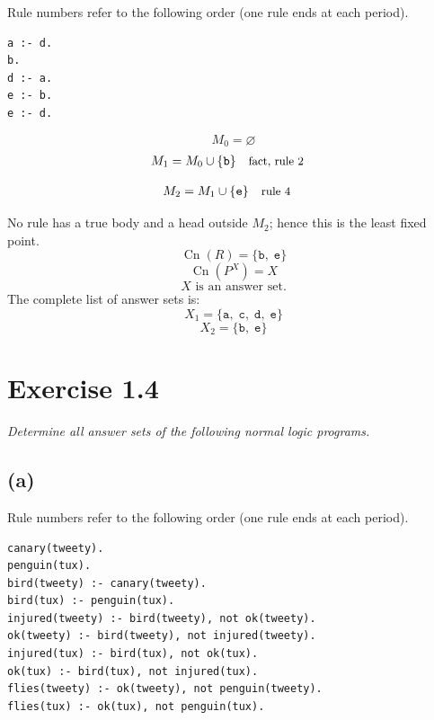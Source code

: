 \documentclass[a4paper,11pt]{article}
\newif\ifexplain
\newcommand{\explain}[1]{\ifexplain\begin{erklbox}#1\end{erklbox}\fi}
\newcommand{\why}[1]{\text{\small #1}}
\newcommand{\angabe}[1]{\textit{#1}\par}
\newcommand{\aufgabe}[1]{\section*{Exercise #1}}
\newcommand{\teil}[1]{\subsection*{(#1)}}
\newcommand{\at}[1]{\texttt{#1}}
\begin{document}
Rule numbers refer to the following order (one rule ends at each period).
\begin{small}
\begin{verbatim}
a :- d.
b.
d :- a.
e :- b.
e :- d.
\end{verbatim}
\end{small}
\explain{Beim Redukt bleibt die Kandidatenmenge fest. Wir entscheiden zuerst, welche Regeln wegfallen. Erst danach berechnen wir aus den verbleibenden positiven Regeln die kleinste abgeschlossene Menge. Ein Modell allein reicht nicht: Diese Menge muss genau der Kandidat sein.}
\[
M_0=\varnothing
\]
\begin{align*}
M_{1} &= M_{0}\cup \{\at{b}\} && \why{fact, rule 2}
\end{align*}
\explain{Diese Regel hat keinen Körper. Ihr Kopf $\at{b}$ ist damit ein Fakt und muss in die Menge.}
\begin{align*}
M_{2} &= M_{1}\cup \{\at{e}\} && \why{rule 4}
\end{align*}
\explain{Für $\at{e}$ brauchen wir $\at{b}$. Weil diese Voraussetzungen bereits hergeleitet sind, dürfen wir den Regelkopf jetzt aufnehmen und alle bisherigen Atome behalten; bei einer fehlenden Voraussetzung würde diese Regel dagegen noch nichts beitragen.}
No rule has a true body and a head outside $M_{2}$; hence this is the least fixed point.
\[
\operatorname{Cn}(R)=\{\at{b},\;\at{e}\}
\]
\[
\operatorname{Cn}(P^X)=X
\]
\[
\boxed{X\text{ is an answer set.}}
\]
The complete list of answer sets is:
\[
\boxed{X_1=\{\at{a},\;\at{c},\;\at{d},\;\at{e}\}}
\]
\[
\boxed{X_2=\{\at{b},\;\at{e}\}}
\]
\aufgabe{1.4}
\angabe{Determine all answer sets of the following normal logic programs.}
\teil{a}
Rule numbers refer to the following order (one rule ends at each period).
\begin{small}
\begin{verbatim}
canary(tweety).
penguin(tux).
bird(tweety) :- canary(tweety).
bird(tux) :- penguin(tux).
injured(tweety) :- bird(tweety), not ok(tweety).
ok(tweety) :- bird(tweety), not injured(tweety).
injured(tux) :- bird(tux), not ok(tux).
ok(tux) :- bird(tux), not injured(tux).
flies(tweety) :- ok(tweety), not penguin(tweety).
flies(tux) :- ok(tux), not penguin(tux).
\end{verbatim}
\end{small}
\explain{Das PDF zeigt diese Regeln ausgeschrieben, damit die Nummern im Beweis passen. In \texttt{clingo/1\_4a.lp} decken Variablen dieselben Fälle kürzer ab: dieselbe Vogelregel, dieselbe Auswahl zwischen \texttt{injured} und \texttt{ok} und dieselbe Flugregel gelten für beide Tiere. Tux fliegt trotzdem nicht, weil \texttt{penguin(tux)} gilt.}
\end{document}
